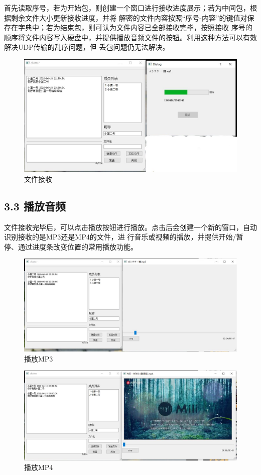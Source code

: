 \documentclass[UTF8]{ctexart}
\begin{document}
首先读取序号，若为开始包，则创建一个窗口进行接收进度展示；若为中间包，根据剩余文件大小更新接收进度，并将
解密的文件内容按照“序号-内容”的键值对保存在字典中；若为结束包，则可认为文件内容已全部接收完毕，按照接收
序号的顺序将文件内容写入硬盘中，并提供播放音频文件的按钮。利用这种方法可以有效解决UDP传输的乱序问题，但
丢包问题仍无法解决。

\begin{figure}[H]
\includegraphics[width=\textwidth]{pic/filerecv1.jpg}
\caption{文件接收}
\end{figure}

\subsection*{3.3 播放音频}
文件接收完毕后，可以点击播放按钮进行播放。点击后会创建一个新的窗口，自动识别接收的是MP3还是MP4的文件，进
行音乐或视频的播放，并提供开始/暂停、通过进度条改变位置的常用播放功能。

\begin{figure}[H]
\includegraphics[width=\textwidth]{pic/MP3.JPG}
\caption{播放MP3}
\end{figure}

\begin{figure}[H]
\includegraphics[width=\textwidth]{pic/MP4.JPG}
\caption{播放MP4}
\end{figure}
\end{document}
